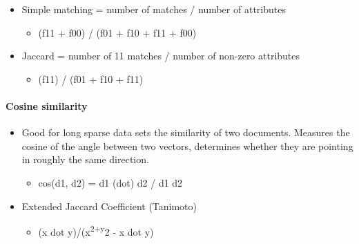 \documentclass[11pt]{article}
\providecommand{\tightlist}{%
      \setlength{\itemsep}{0pt}\setlength{\parskip}{0pt}}
\begin{document}
    \begin{itemize}
\tightlist
\item
  Simple matching = number of matches / number of attributes

  \begin{itemize}
  \tightlist
  \item
    (f11 + f00) / (f01 + f10 + f11 + f00)
  \end{itemize}
\end{itemize}

    \begin{itemize}
\tightlist
\item
  Jaccard = number of 11 matches / number of non-zero attributes

  \begin{itemize}
  \tightlist
  \item
    (f11) / (f01 + f10 + f11)
  \end{itemize}
\end{itemize}

    \paragraph{Cosine similarity}\label{cosine-similarity}

    \begin{itemize}
\tightlist
\item
  Good for long sparse data sets the similarity of two documents.
  Measures the cosine of the angle between two vectors, determines
  whether they are pointing in roughly the same direction.

  \begin{itemize}
  \tightlist
  \item
    cos(d1, d2) = d1 (dot) d2 /
    \textbar{}\textbar{}d1\textbar{}\textbar{}
    \textbar{}\textbar{}d2\textbar{}\textbar{}
  \end{itemize}
\end{itemize}

    \begin{itemize}
\tightlist
\item
  Extended Jaccard Coefficient (Tanimoto)

  \begin{itemize}
  \tightlist
  \item
    (x dot
    y)/(\textbar{}\textbar{}x\textbar{}\textbar{}\textsuperscript{2+\textbar{}\textbar{}y\textbar{}\textbar{}}2
    - x dot y)
  \end{itemize}
\end{itemize}
\end{document}
